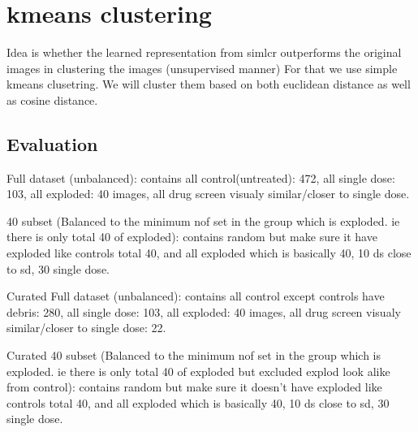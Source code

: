\section{kmeans clustering}

Idea is whether the learned representation from simlcr outperforms the original images in clustering the images (unsupervised manner) For that we use simple kmeans 
clusetring. We will cluster them based on both euclidean distance as well as cosine distance.





\subsection{Evaluation}

Full dataset (unbalanced): contains all control(untreated): 472, all single dose: 103, all exploded: 40 images, all drug screen visualy similar/closer to single dose.

40 subset (Balanced to the minimum nof set in the group which is exploded. ie there is only total 40 of exploded): contains random but make sure it have exploded like 
controls total 40, and all exploded which is basically 40, 10 ds close to sd, 30 single dose.

Curated Full dataset (unbalanced): contains all control except controls have debris: 280, all single dose: 103, all exploded: 40 images, all drug screen visualy 
similar/closer to single dose: 22.

Curated 40 subset  (Balanced to the minimum nof set in the group which is exploded. ie there is only total 40 of exploded but excluded explod look alike from control):
contains random but make sure it doesn't have exploded like controls total 40, and all exploded which is basically 40, 10 ds close to sd, 30 single dose.


